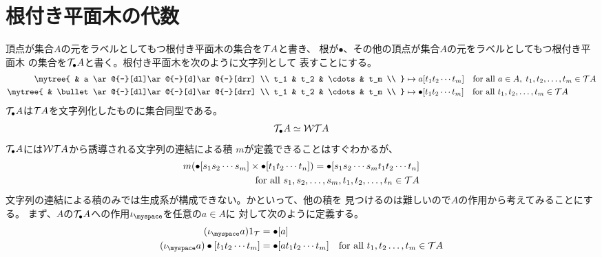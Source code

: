 \section{根付き平面木の代数}\label{s1:根付き平面木の代数} %
	頂点が集合$A$の元をラベルとしてもつ根付き平面木の集合を$\mathcal{T} A$と書き、
	根が$\bullet$、その他の頂点が集合$A$の元をラベルとしてもつ根付き平面木
	の集合を$\mathcal{T}_\bullet A$と書く。根付き平面木を次のように文字列として
	表すことにする。
	\begin{equation*}\begin{split} %
		\mytree{
			& a \ar@{-}[dl]\ar@{-}[d]\ar@{-}[drr] \\
			t_1 & t_2 & \cdots & t_m \\
		} &\mapsto a\word{t_1t_2\cdots t_m}
		\quad\text{for all }a\in A,\;t_1,t_2,\dots,t_m\in\Tree A \\
		\mytree{
			& \bullet \ar@{-}[dl]\ar@{-}[d]\ar@{-}[drr] \\
			t_1 & t_2 & \cdots & t_m \\
		} &\mapsto \bullet\word{t_1t_2\cdots t_m}
		\quad\text{for all }t_1,t_2,\dots,t_m\in\Tree A
	\end{split}\end{equation*} %
	$\mathcal{T}_\bullet A$は$\mathcal{T} A$を文字列化したものに集合同型である。
	\begin{equation*}\begin{split} %
		\Tree_\bullet A\simeq \Word\Tree A
	\end{split}\end{equation*} %
	$\mathcal{T}_\bullet A$には$\mathcal{W}{\mathcal{T}} A$から誘導される文字列の連結による積
	$m$が定義できることはすぐわかるが、
	\begin{equation*}\begin{split} %
		m(\bullet\word{s_1s_2\cdots s_m}\times\bullet\word{t_1t_2\cdots t_n})
		= \bullet\word{s_1s_2\cdots s_mt_1t_2\cdots t_n} \\
		\quad\text{for all }s_1,s_2,\dots,s_m,t_1,t_2,\dots,t_n\in\Tree A
	\end{split}\end{equation*} %
	文字列の連結による積のみでは生成系が構成できない。かといって、他の積を
	見つけるのは難しいので$A$の作用から考えてみることにする。
	まず、$A$の$\mathcal{T}_\bullet A$への作用$\iota_\myspace$を任意の$a\in A$に
	対して次のように定義する。
	\begin{equation*}\begin{split} %
		(\iota_\myspace a)\treeu &= \bullet\word{a} \\
		(\iota_\myspace a)\bullet\word{t_1t_2\cdots t_m}
		&= \bullet\word{at_1t_2\cdots t_m}
		\quad\text{for all }t_1,t_2\dots,t_m\in\Tree A
	\end{split}\end{equation*} %
